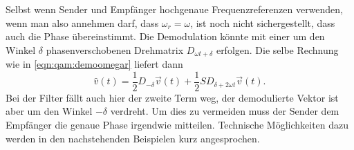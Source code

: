 Selbst wenn Sender und Empfänger hochgenaue Frequenzreferenzen verwenden,
wenn man also annehmen darf, dass $\omega_r=\omega$,
ist noch nicht sichergestellt, dass auch die Phase übereinstimmt.
Die Demodulation könnte mit einer um den Winkel $\delta$
phasenverschobenen Drehmatrix $D_{\omega t+\delta}$ erfolgen.
Die selbe Rechnung wie in \eqref{eqn:qam:demoomegar} liefert dann
\[
\hat{v}(t)
=
\frac12D_{-\delta}\vec{v}(t)
+
\frac12SD_{\delta+2\omega t}\vec{v}(t).
\]
Bei der Filter fällt auch hier der zweite Term weg, der demodulierte
Vektor ist aber um den Winkel $-\delta$ verdreht.
Um dies zu vermeiden muss der Sender dem Empfänger die genaue Phase
irgendwie mitteilen.
Technische Möglichkeiten dazu werden in den nachstehenden Beispielen
kurz angesprochen.







